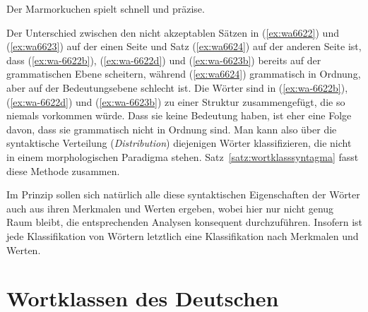 \begin{exe}
  \ex\label{ex:wa6624}{Der Marmorkuchen spielt schnell und präzise.}
\end{exe}

Der Unterschied zwischen den nicht akzeptablen Sätzen in (\ref{ex:wa6622}) und (\ref{ex:wa6623}) auf der einen Seite und Satz (\ref{ex:wa6624}) auf der anderen Seite ist, dass (\ref{ex:wa-6622b}), (\ref{ex:wa-6622d}) und (\ref{ex:wa-6623b}) bereits auf der grammatischen Ebene scheitern, während (\ref{ex:wa6624}) grammatisch in Ordnung, aber auf der Bedeutungsebene schlecht ist.
Die Wörter sind in (\ref{ex:wa-6622b}), (\ref{ex:wa-6622d}) und (\ref{ex:wa-6623b}) zu einer Struktur zusammengefügt, die so niemals vorkommen würde.
Dass sie keine Bedeutung haben, ist eher eine Folge davon, dass sie grammatisch nicht in Ordnung sind.
Man kann also über die syntaktische Verteilung (\textit{Distribution}) diejenigen Wörter klassifizieren, die nicht in einem morphologischen Paradigma stehen.
Satz~\ref{satz:wortklasssyntagma} fasst diese Methode zusammen.


Im Prinzip sollen sich natürlich alle diese syntaktischen Eigenschaften der Wörter auch aus ihren Merkmalen und Werten ergeben, wobei hier nur nicht genug Raum bleibt, die entsprechenden Analysen konsequent durchzuführen.
Insofern ist jede Klassifikation von Wörtern letztlich eine Klassifikation nach Merkmalen und Werten.




\section{Wortklassen des Deutschen}

\label{sec:wortklassendesdeutschen}

